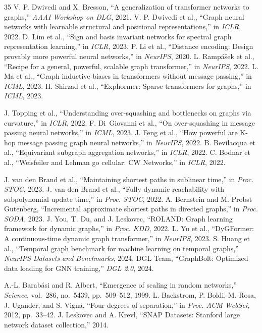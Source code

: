 \documentclass[journal]{IEEEtran}
\begin{document}
\begin{thebibliography}{35}
 V. P. Dwivedi and X. Bresson, ``A generalization of transformer networks to graphs,'' \emph{AAAI Workshop on DLG}, 2021.
 V. P. Dwivedi et al., ``Graph neural networks with learnable structural and positional representations,'' in \emph{ICLR}, 2022.
 D. Lim et al., ``Sign and basis invariant networks for spectral graph representation learning,'' in \emph{ICLR}, 2023.
 P. Li et al., ``Distance encoding: Design provably more powerful neural networks,'' in \emph{NeurIPS}, 2020.
 L. Ramp\'{a}\v{s}ek et al., ``Recipe for a general, powerful, scalable graph transformer,'' in \emph{NeurIPS}, 2022.
 L. Ma et al., ``Graph inductive biases in transformers without message passing,'' in \emph{ICML}, 2023.
 H. Shirzad et al., ``Exphormer: Sparse transformers for graphs,'' in \emph{ICML}, 2023.

 J. Topping et al., ``Understanding over-squashing and bottlenecks on graphs via curvature,'' in \emph{ICLR}, 2022.
 F. Di~Giovanni et al., ``On over-squashing in message passing neural networks,'' in \emph{ICML}, 2023.
 J. Feng et al., ``How powerful are K-hop message passing graph neural networks,'' in \emph{NeurIPS}, 2022.
 B. Bevilacqua et al., ``Equivariant subgraph aggregation networks,'' in \emph{ICLR}, 2022.
 C. Bodnar et al., ``Weisfeiler and Lehman go cellular: CW Networks,'' in \emph{ICLR}, 2022.

 J. van den Brand et al., ``Maintaining shortest paths in sublinear time,'' in \emph{Proc. STOC}, 2023.
 J. van den Brand et al., ``Fully dynamic reachability with subpolynomial update time,'' in \emph{Proc. STOC}, 2022.
 A. Bernstein and M. Probst Gutenberg, ``Incremental approximate shortest paths in directed graphs,'' in \emph{Proc. SODA}, 2023.
 J. You, T. Du, and J. Leskovec, ``ROLAND: Graph learning framework for dynamic graphs,'' in \emph{Proc. KDD}, 2022.
 L. Yu et al., ``DyGFormer: A continuous-time dynamic graph transformer,'' in \emph{NeurIPS}, 2023.
 S. Huang et al., ``Temporal graph benchmark for machine learning on temporal graphs,'' \emph{NeurIPS Datasets and Benchmarks}, 2024.
 DGL Team, ``GraphBolt: Optimized data loading for GNN training,'' \emph{DGL 2.0}, 2024.

 A.-L. Barab\'{a}si and R. Albert, ``Emergence of scaling in random networks,'' \emph{Science}, vol.~286, no.~5439, pp.~509--512, 1999.
 L. Backstrom, P. Boldi, M. Rosa, J. Ugander, and S. Vigna, ``Four degrees of separation,'' in \emph{Proc. ACM WebSci}, 2012, pp.~33--42.
 J. Leskovec and A. Krevl, ``SNAP Datasets: Stanford large network dataset collection,'' 2014.

\end{thebibliography}
\end{document}
